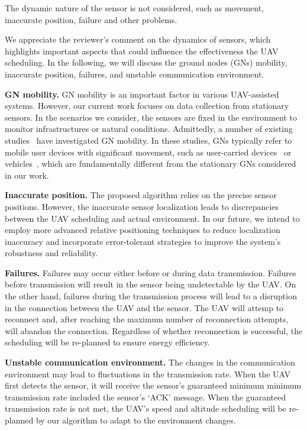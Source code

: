 \begin{revcomment}
	The dynamic nature of the sensor is not considered, such as movement, inaccurate position, failure and other problems.
\end{revcomment}
\begin{revresponse}
	We appreciate the reviewer's comment on the dynamics of sensors, which highlights important aspects that could influence the effectiveness the UAV scheduling.
	In the following, we will discuss the ground nodes (GNs) mobility, inaccurate position, failures, and unstable communication environment.

	\textbf{GN mobility.}
	GN mobility is an important factor in various UAV-assisted systems.
	However, our current work focuses on data collection from stationary sensors.
	In the scenarios we consider, the sensors are fixed in the environment to monitor infrastructures or natural conditions.
	Admittedly, a number of existing studies~\cite{GNmob1, GNmob2, GNmob3, GNmob4} have investigated GN mobility.
	In these studies, GNs typically refer to mobile user devices with significant movement, such as user-carried devices~\cite{GNmob1,GNmob2} or vehicles~\cite{GNmob3,GNmob4}, which are fundamentally different from the stationary GNs considered in our work.

	\textbf{Inaccurate position.}
	The proposed algorithm relies on the precise sensor positions.
	However, the inaccurate sensor localization leads to discrepancies between the UAV scheduling and actual environment.
	In our future, we intend to employ more advanced relative positioning techniques to reduce localization inaccuracy and incorporate error-tolerant strategies to improve the system's robustness and reliability.

	\textbf{Failures.}
	Failures may occur either before or during data transmission.
	Failures before transmission will result in the sensor being undetectable by the UAV.
	On the other hand, failures during the transmission process will lead to a disruption in the connection between the UAV and the sensor.
	The UAV will attemp to reconnect and, after reaching the maximum number of reconnection attempts, will abandon the connection.
	Regardless of whether reconnection is successful, the scheduling will be re-planned to ensure energy efficiency.

	\textbf{Unstable communication environment.}
	The changes in the communication environment may lead to fluctuations in the transmission rate.
	When the UAV first detects the sensor, it will receive the sensor's guaranteed minimum minimum transmission rate included the sensor's `ACK' message.
	When the guaranteed transmission rate is not met, the UAV's speed and altitude scheduling will be re-planned by our algorithm to adapt to the environment changes. 

\end{revresponse}

